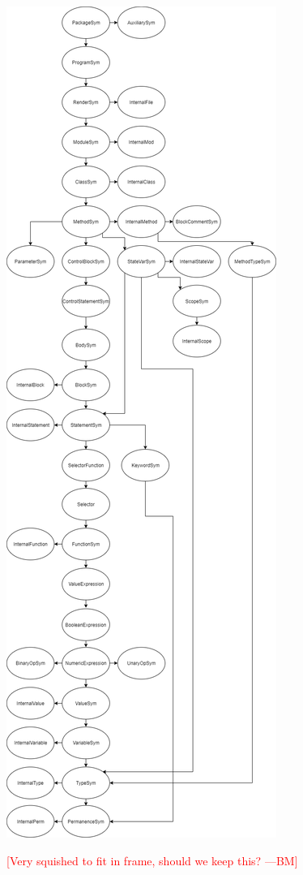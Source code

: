 \documentclass{beamer}
\newcommand{\authornote}[3]{\textcolor{#1}{[#3 ---#2]}}
\newcommand{\bmac}[1]{\authornote{red}{BM}{#1}}
\begin{document}
\begin{frame}
\centering
\includegraphics[scale=0.12]{GOOLClasses.png}

\bmac{Very squished to fit in frame, should we keep this?}
\end{frame}
\end{document}
